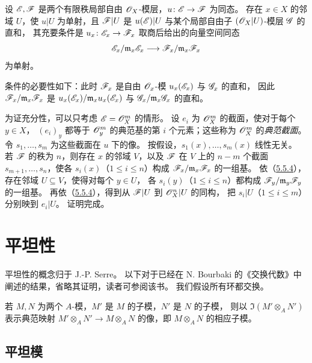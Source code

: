 设 $\mathscr E,\mathscr F$ 是两个有限秩局部自由 $\mathscr O_X$-模层，$u\colon\mathscr E\to\mathscr F$ 为同态。
存在 $x\in X$ 的邻域 $U$，使 $u|U$ 为单射，且 $\mathscr F|U$ 是 $u(\mathscr E)|U$
与某个局部自由子 $(\mathscr O_X|U)$-模层 $\mathscr G$ 的直和，
其充要条件是 $u_x\colon\mathscr E_x\to\mathscr F_x$ 取商后给出的向量空间同态
\[
 \mathscr E_x/\mathfrak m_x\mathscr E_x\longrightarrow\mathscr F_x/\mathfrak m_x\mathscr F_x
\]
为单射。

条件的必要性如下：此时 $\mathscr F_x$ 是自由 $\mathscr O_x$-模 $u_x(\mathscr E_x)$ 与 $\mathscr G_x$ 的直和，
因此 $\mathscr F_x/\mathfrak m_x\mathscr F_x$ 是
$u_x(\mathscr E_x)/\mathfrak m_xu_x(\mathscr E_x)$ 与 $\mathscr G_x/\mathfrak m_x\mathscr G_x$ 的直和。

为证充分性，可以只考虑 $\mathscr E=\mathscr O_X^m$ 的情形。
设 $e_i$ 为 $\mathscr O_X^m$ 的截面，使对于每个 $y\in X$，
$(e_i)_y$ 都等于 $\mathscr O_y^m$ 的典范基的第 $i$ 个元素；这些称为 $\mathscr O_X^m$ 的\emph{典范截面}。
令 $s_1,\ldots,s_m$ 为这些截面在 $u$ 下的像。
按假设，$s_1(x),\ldots,s_m(x)$ 线性无关。
若 $\mathscr F$ 的秩为 $n$，则存在 $x$ 的邻域 $V$，以及 $\mathscr F$ 在 $V$ 上的 $n-m$ 个截面
$s_{m+1},\ldots,s_n$，使各 $s_i(x)$（$1\leq i\leq n$）构成
$\mathscr F_x/\mathfrak m_x\mathscr F_x$ 的一组基。
依（\hyperlink{para:0:5.5.4}{5.5.4}），存在邻域 $U\subseteq V$，使得对每个 $y\in U$，
各 $s_i(y)$（$1\leq i\leq n$）都构成 $\mathscr F_y/\mathfrak m_y\mathscr F_y$ 的一组基。
再依（\hyperlink{para:0:5.5.4}{5.5.4}），得到从 $\mathscr F|U$ 到 $\mathscr O_X^n|U$ 的同构，
把 $s_i|U$（$1\leq i\leq m$）分别映到 $e_i|U$。
证明完成。



\par

\section{平坦性}\hypertarget{heading:0:6}{}

平坦性的概念归于 J.-P. Serre\cite{b16}。
以下对于已经在 N. Bourbaki 的《交换代数》中阐述的结果，省略其证明，读者可参阅该书。
我们假设所有环都交换。

若 $M,N$ 为两个 $A$-模，$M'$ 是 $M$ 的子模，$N'$ 是 $N$ 的子模，
则以 $\Im(M'\otimes_A N')$ 表示典范映射
$M'\otimes_A N'\to M\otimes_A N$ 的像，即 $M\otimes_A N$ 的相应子模。

\subsection{平坦模}\hypertarget{heading:0:6.1}{}

